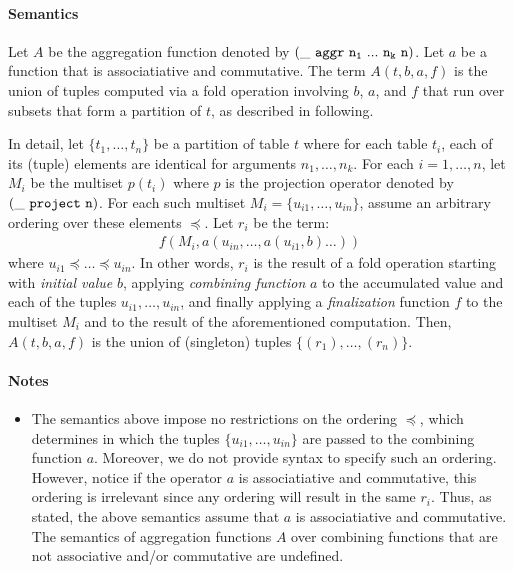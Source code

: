 \documentclass[english,a4paper,10pt]{article}
\begin{document}
\paragraph{Semantics}
Let $A$ be the aggregation function
denoted by $
{\tt (\_\ aggr\ n_1\ ...\ n_k\ n)}$.
Let $a$ be a function that is associatiative and commutative.
The term $A( t, b, a, f)$ is
the union of tuples computed via a fold operation involving $b$, $a$, and $f$
that run over subsets that form a partition of $t$, as described in following.

In detail,
let $\{ t_1, \ldots, t_n \}$ be a partition of table $t$
where for each table $t_i$, each of its (tuple) elements
are identical for arguments $n_1, \ldots, n_k$.
For each $i = 1, \ldots, n$,
let $M_i$ be the multiset $p(t_i)$
where $p$ is the projection operator denoted by ${\tt (\_\ project\ n)}$.
For each such multiset $M_i = \{ u_{i1}, \ldots, u_{in} \}$,
assume an arbitrary ordering over these elements $\preceq$.
Let $r_i$ be the term:
\begin{align*}
f( M_i, a( u_{in}, \ldots, a( u_{i1}, b ) \ldots ) )
\end{align*}
where $u_{i1} \preceq \ldots \preceq u_{in}$.
In other words,
$r_i$ is the result of a fold operation
starting with \emph{initial value} $b$,
applying \emph{combining function} $a$ to
the accumulated value and each of the tuples $u_{i1}, \ldots, u_{in}$,
and finally applying a \emph{finalization} function $f$
to the multiset $M_i$ and to the result of the aforementioned computation.
Then,
$A( t, b, a, f)$ is
the union of (singleton) tuples $\{ (r_1), \ldots, (r_n) \}$.

\paragraph{Notes}
\begin{itemize}
\item
The semantics above impose no restrictions on the ordering $\preceq$,
which determines in which the tuples $\{ u_{i1}, \ldots, u_{in} \}$
are passed to the combining function $a$.
Moreover, 
we do not provide syntax to specify such an ordering.
However, notice if the operator $a$ is associatiative
and commutative, 
this ordering is irrelevant since any ordering
will result in the same $r_i$.
Thus, as stated, the above semantics assume that $a$
is associatiative and commutative.
The semantics
of aggregation functions $A$ over
combining functions that are not associative and/or commutative are undefined.
\end{itemize}
\end{document}
